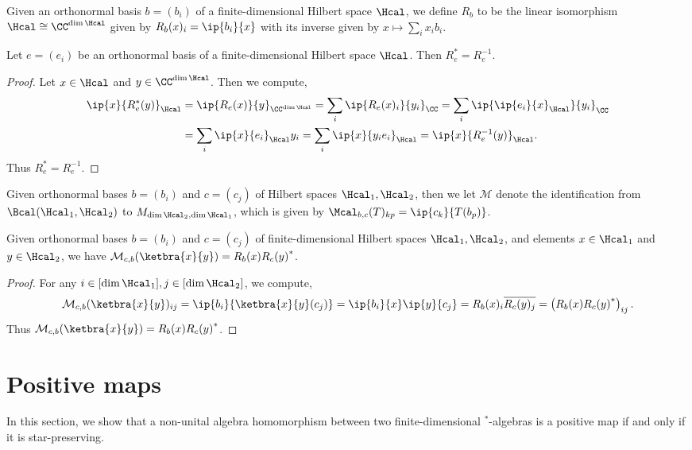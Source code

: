  Given an orthonormal basis $b=(b_i)$ of a finite-dimensional Hilbert space $\Hcal$, we define $R_b$ to be the linear isomorphism $\Hcal\cong\CC^{\dim\Hcal}$ given by $R_b(x)_i=\ip{b_i}{x}$ with its inverse given by $x\mapsto\sum_ix_ib_i$.
 \begin{lemma}\label{repr_adjoint}\leanok
  Let $e=(e_i)$ be an orthonormal basis of a finite-dimensional Hilbert space $\Hcal$. Then $R_e^*=R_e^{-1}$.
 \end{lemma}
 \begin{proof}\leanok
  Let $x\in\Hcal$ and $y\in\CC^{\dim\Hcal}$. Then we compute,
  \begin{align*}
   \ip{x}{R_e^*(y)}_{\Hcal} &= \ip{R_e(x)}{y}_{\CC^{\dim\Hcal}} = \sum_i\ip{R_e(x)_i}{y_i}_{\CC} = \sum_i\ip{\ip{e_i}{x}_{\Hcal}}{y_i}_{\CC}\\
   &= \sum_i\ip{x}{e_i}_{\Hcal}y_i = \sum_i\ip{x}{y_ie_i}_{\Hcal}=\ip{x}{R_e^{-1}(y)}_{\Hcal}.
  \end{align*}
  Thus $R_e^*=R_e^{-1}$.
 \end{proof}
 Given orthonormal bases $b=(b_i)$ and $c=(c_j)$ of Hilbert spaces $\Hcal_1,\Hcal_2$, then we let $\mathcal{M}$ denote the identification from $\Bcal(\Hcal_1,\Hcal_2)$ to $M_{\dim\Hcal_2,\dim\Hcal_1}$, which is given by $\Mcal_{b,c}(T)_{kp}=\ip{c_k}{T(b_p)}$.
 \begin{lemma}\label{rankOne_toMatrix}\leanok
  Given orthonormal bases $b=(b_i)$ and $c=(c_j)$ of finite-dimensional Hilbert spaces $\Hcal_1,\Hcal_2$, and elements $x\in\Hcal_1$ and $y\in\Hcal_2$, we have $\mathcal{M}_{c,b}(\ketbra{x}{y})=R_b(x){R_c(y)}^*$.
 \end{lemma}
 \begin{proof}\leanok
  For any $i\in[\dim\Hcal_1],j\in[\dim\Hcal_2]$, we compute,
  \[\mathcal{M}_{c,b}(\ketbra{x}{y})_{ij}=\ip{b_i}{\ketbra{x}{y}(c_j)}=\ip{b_i}{x}\ip{y}{c_j}=R_b(x)_i\overline{R_c(y)_j}=\left(R_b(x){R_c(y)}^*\right)_{ij}.\]
  Thus $\mathcal{M}_{c,b}(\ketbra{x}{y})=R_b(x){R_c(y)}^*$.
 \end{proof}


\chapter{Positive maps}

 In this section, we show that a non-unital algebra homomorphism between two finite-dimensional $^*$-algebras is a positive map if and only if it is star-preserving.

